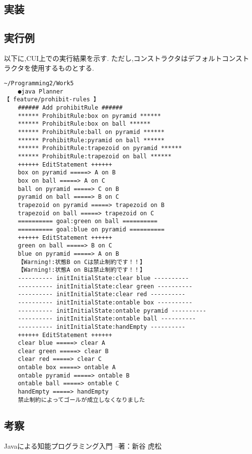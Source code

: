 \documentclass[uplatex,12pt]{jsarticle}
\begin{document}
\subsection{実装}


\subsection{実行例}
以下に,CUI上での実行結果を示す.
ただし,コンストラクタはデフォルトコンストラクタを使用するものとする.
\begin{lstlisting}[caption=禁止制約を課した時の実行結果, label=mid]
    ~/Programming2/Work5
    ●java Planner                                                                                                                                                                                                    【 feature/prohibit-rules 】
    ###### Add prohibitRule ######
    ****** ProhibitRule:box on pyramid ******
    ****** ProhibitRule:box on ball ******
    ****** ProhibitRule:ball on pyramid ******
    ****** ProhibitRule:pyramid on ball ******
    ****** ProhibitRule:trapezoid on pyramid ******
    ****** ProhibitRule:trapezoid on ball ******
    ++++++ EditStatement ++++++
    box on pyramid =====> A on B
    box on ball =====> A on C
    ball on pyramid =====> C on B
    pyramid on ball =====> B on C
    trapezoid on pyramid =====> trapezoid on B
    trapezoid on ball =====> trapezoid on C
    ========== goal:green on ball ==========
    ========== goal:blue on pyramid ==========
    ++++++ EditStatement ++++++
    green on ball =====> B on C
    blue on pyramid =====> A on B
    【Warning!:状態B on Cは禁止制約です！！】
    【Warning!:状態A on Bは禁止制約です！！】
    ---------- initInitialState:clear blue ----------
    ---------- initInitialState:clear green ----------
    ---------- initInitialState:clear red ----------
    ---------- initInitialState:ontable box ----------
    ---------- initInitialState:ontable pyramid ----------
    ---------- initInitialState:ontable ball ----------
    ---------- initInitialState:handEmpty ----------
    ++++++ EditStatement ++++++
    clear blue =====> clear A
    clear green =====> clear B
    clear red =====> clear C
    ontable box =====> ontable A
    ontable pyramid =====> ontable B
    ontable ball =====> ontable C
    handEmpty =====> handEmpty
    禁止制約によってゴールが成立しなくなりました
\end{lstlisting}

\subsection{考察}



\begin{thebibliography}{99}
 Javaによる知能プログラミング入門 --著：新谷 虎松 \\
\end{thebibliography}
\end{document}
